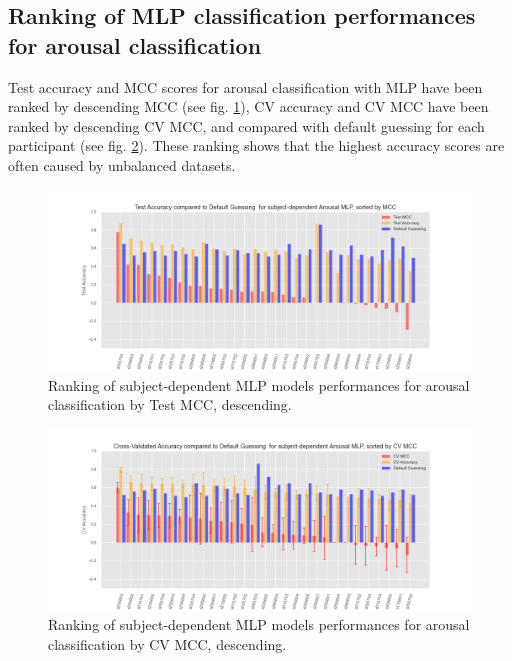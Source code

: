 \subsection{Ranking of MLP classification performances for arousal classification}
\label{sec:appendix_A4.2}
Test accuracy and \ac{MCC} scores for arousal classification with \ac{MLP} have been ranked by descending \ac{MCC} (see fig. \ref{fig:test_acc_mcc_arousal_mlp}), CV accuracy and \ac{CV MCC} have been ranked by descending \ac{CV MCC}, and compared with default guessing for each participant (see fig. \ref{fig:test_cv_acc_mcc_arousal_mlp}). These ranking shows that the highest accuracy scores are often caused by unbalanced datasets. 

\begin{figure}[!htb]
\includegraphics[width=16cm]{img/appendix/final_experiment/test_acc_mcc_arousal_mlp.png}
\centering
\caption{Ranking of subject-dependent MLP models performances for arousal classification by Test MCC, descending.}\label{fig:test_acc_mcc_arousal_mlp}
\end{figure}

\begin{figure}[!htb]
\includegraphics[width=16cm]{img/appendix/final_experiment/test_cv_acc_mcc_arousal_mlp.png}
\centering
\caption{Ranking of subject-dependent MLP models performances for arousal classification by CV MCC, descending.}\label{fig:test_cv_acc_mcc_arousal_mlp}
\end{figure}
\FloatBarrier

